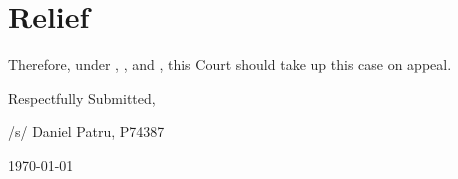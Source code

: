 \documentclass[12pt,\documentclassflag]{michiganCourtOfAppealsBrief}
\begin{document}


\section{Relief}

Therefore, under \cite{MCR 7.305(B)(3)}, \cite{MCR 7.305(B)(5a)}, and \cite{MCR 7.305(B)(5b)}, this Court should take up this case on appeal.



\vspace{1\baselineskip}

{ \setlength{\leftskip}{3.5in}
  Respectfully Submitted,

  /s/ Daniel Patru, P74387

\today

  \setlength{\leftskip}{0pt}}


\newpage\empty%

\pagestyle{fancy}
\fancyhf{}
\fancyhead{}
\fancyfoot{}
\renewcommand\headrule{}

\newcommand{\addLabelsToAllIncludedPages}[1]{%
   \refstepcounter{includepdfpage}%
   \stepcounter{currentpagecounter}%
   \label{#1.\thecurrentpagecounter}}%

\newcommand{\myincludepdf}[2]{%
  \setcounter{currentpagecounter}{0}%
  {appendix/#1.pdf}}%
  
\end{document}
